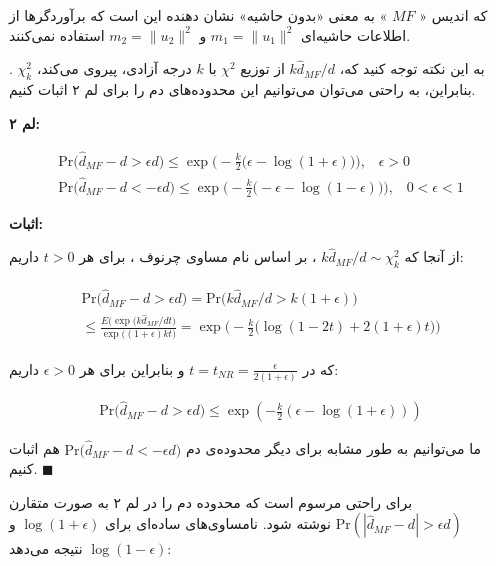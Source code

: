 که اندیس «
$MF$
» به معنی «بدون حاشیه»%
نشان دهنده این است که برآوردگرها از اطلاعات حاشیه‌ای 
$m_1 = \| u_1 \|^2$
و 
$m_2 = \| u_2 \|^2$
استفاده نمی‌کنند.

به این نکته توجه کنید که، 
$k \hat{d}_{MF} / d$
از توزیع 
$\chi^2$
با 
$k$
درجه آزادی، پیروی می‌کند،
$\chi_k^2$
. بنابراین، به راحتی می‌توان می‌توانیم این محدوده‌‌های دم را برای لم ۲ اثبات کنیم.

\textbf{
لم ۲:
}

\begin{align}
\mathrm{Pr} \big( \hat{d}_{MF} - d > \epsilon d) \leq \exp \Bigg( - \frac{k}{2} \big( \epsilon - \log( 1+ \epsilon) \big) \Bigg), \;\;\; \epsilon > 0 
\label{eq:1iE} \\
\mathrm{Pr} \big( \hat{d}_{MF} - d < -\epsilon d) \leq \exp \Bigg( - \frac{k}{2} \big( -\epsilon - \log( 1 - \epsilon) \big) \Bigg), \;\;\; 0 < \epsilon < 1 
\label{eq:1iF} 
\end{align}

\textbf{
اثبات:
}

از آنجا که 
$k \hat{d}_{MF} / d \sim \chi_k^2 $
، بر اساس نام مساوی چرنوف%
\cite{litez46}
، برای هر 
$t > 0$ 
داریم:

\begin{align}
\begin{split}
\mathrm{Pr} \big( \hat{d}_{MF} - d > \epsilon d) = 
\mathrm{Pr} \big( k \hat{d}_{MF} / d > k(1+\epsilon) \big) \\
\leq 
\frac{E\bigg( \exp (k \hat{d}_{MF} /dt \bigg) }{\exp \big( (1+\epsilon ) kt \big) } =
\exp \Bigg( - \frac{k}{2} \big( \log (1-2t) + 2(1 + \epsilon) t \big) \Bigg)
\end{split}
\label{eq:1iG}
\end{align}

که در 
$t = t_{NR} = \frac{\epsilon}{2(1+\epsilon)}$
و بنابراین برای هر 
$\epsilon > 0$
داریم:

\begin{align}
\mathrm{Pr} \big( \hat{d}_{MF} - d > \epsilon d) \leq \exp \left( -\frac{k}{2} \left( \epsilon - \log \left( 1 + \epsilon \right) \right) \right)
\label{eq:1iH}
\end{align}

ما می‌توانیم به طور مشابه برای دیگر محدوده‌ی دم 
$\mathrm{Pr} \big( \hat{d}_{MF} - d < -\epsilon d)$
هم اثبات کنیم.
$\blacksquare$

\bigskip

برای راحتی مرسوم است که محدوده دم را در لم ۲ به صورت متقارن 
$\mathrm{Pr} \left( \left| \hat{d}_{MF} - d \right| > \epsilon d \right)$
نوشته شود. نامساوی‌های ساده‌ای برای 
$\log(1+\epsilon)$
و 
$\log(1-\epsilon)$
نتیجه می‌دهد:

